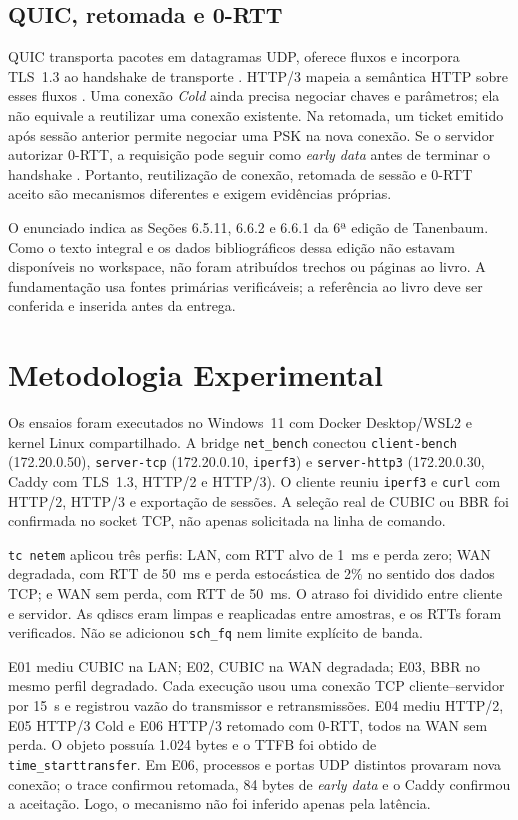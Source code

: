 \documentclass[12pt]{article}
\begin{document}
\subsection{QUIC, retomada e 0-RTT}

QUIC transporta pacotes em datagramas UDP, oferece fluxos e incorpora TLS~1.3 ao handshake de transporte \cite{rfc9000,rfc9001}. HTTP/3 mapeia a semântica HTTP sobre esses fluxos \cite{rfc9114}. Uma conexão \emph{Cold} ainda precisa negociar chaves e parâmetros; ela não equivale a reutilizar uma conexão existente. Na retomada, um ticket emitido após sessão anterior permite negociar uma PSK na nova conexão. Se o servidor autorizar 0-RTT, a requisição pode seguir como \emph{early data} antes de terminar o handshake \cite{rfc8446}. Portanto, reutilização de conexão, retomada de sessão e 0-RTT aceito são mecanismos diferentes e exigem evidências próprias.

O enunciado indica as Seções 6.5.11, 6.6.2 e 6.6.1 da 6ª edição de Tanenbaum. Como o texto integral e os dados bibliográficos dessa edição não estavam disponíveis no workspace, não foram atribuídos trechos ou páginas ao livro. A fundamentação usa fontes primárias verificáveis; a referência ao livro deve ser conferida e inserida antes da entrega.

\section{Metodologia Experimental}

Os ensaios foram executados no Windows~11 com Docker Desktop/WSL2 e kernel Linux compartilhado. A bridge \texttt{net\_bench} conectou \texttt{client-bench} (172.20.0.50), \texttt{server-tcp} (172.20.0.10, \texttt{iperf3}) e \texttt{server-http3} (172.20.0.30, Caddy com TLS~1.3, HTTP/2 e HTTP/3). O cliente reuniu \texttt{iperf3} e \texttt{curl} com HTTP/2, HTTP/3 e exportação de sessões. A seleção real de CUBIC ou BBR foi confirmada no socket TCP, não apenas solicitada na linha de comando.

\texttt{tc netem} aplicou três perfis: LAN, com RTT alvo de 1~ms e perda zero; WAN degradada, com RTT de 50~ms e perda estocástica de 2\% no sentido dos dados TCP; e WAN sem perda, com RTT de 50~ms. O atraso foi dividido entre cliente e servidor. As qdiscs eram limpas e reaplicadas entre amostras, e os RTTs foram verificados. Não se adicionou \texttt{sch\_fq} nem limite explícito de banda.

E01 mediu CUBIC na LAN; E02, CUBIC na WAN degradada; E03, BBR no mesmo perfil degradado. Cada execução usou uma conexão TCP cliente--servidor por 15~s e registrou vazão do transmissor e retransmissões. E04 mediu HTTP/2, E05 HTTP/3 Cold e E06 HTTP/3 retomado com 0-RTT, todos na WAN sem perda. O objeto possuía 1.024 bytes e o TTFB foi obtido de \texttt{time\_starttransfer}. Em E06, processos e portas UDP distintos provaram nova conexão; o trace confirmou retomada, 84 bytes de \emph{early data} e o Caddy confirmou a aceitação. Logo, o mecanismo não foi inferido apenas pela latência.
\end{document}
